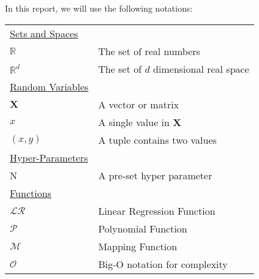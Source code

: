 In this report, we will use the following notations:

\begin{table}[h]
\begin{tabularx}{\textwidth}{@{}XX@{}}
\toprule
  \underline{Sets and Spaces} \\
  $\mathbb{R}$ & The set of real numbers \\
  $\mathbb{R}^d$ & The set of $d$ dimensional real space \\
  \underline{Random Variables} \\
  $\textbf{X}$ & A vector or matrix \\
  $x$ & A single value in $\textbf{X}$ \\
  $(x,y)$ & A tuple contains two values \\	
  \underline{Hyper-Parameters} \\
  N   & A pre-set hyper parameter \\
  \underline{Functions} \\
  $\mathcal{LR}$ & Linear Regression Function\\
  $\mathcal{P}$ & Polynomial Function\\
  $\mathcal{M}$ & Mapping Function\\
  $\mathcal{O}$ & Big-O notation for complexity\\
\bottomrule
\end{tabularx}
\end{table}
